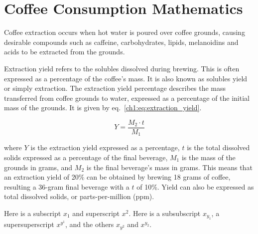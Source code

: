 \chapter{Coffee Consumption Mathematics}

Coffee extraction occurs when hot water is poured over coffee grounds, causing
desirable compounds such as caffeine, carbohydrates, lipids, melanoidins and
acids to be extracted from the grounds.

Extraction yield refers to the solubles dissolved during brewing. This is often
expressed as a percentage of the coffee's mass. It is also known as solubles
yield or simply extraction. The extraction yield percentage describes the mass
transferred from coffee grounds to water, expressed as a percentage of the
initial mass of the grounds. It is given by eq.~\eqref{ch1:eq:extraction_yield}.

\begin{equation}
    Y = \frac{M_2 \cdot t}{M_1}
    \label{ch1:eq:extraction_yield}
\end{equation}

where $Y$ is the extraction yield expressed as a percentage, $t$ is the total
dissolved solids expressed as a percentage of the final beverage, $M_1$ is the
mass of the grounds in grams, and $M_2$ is the final beverage's mass in grams.
This means that an extraction yield of 20\% can be obtained by brewing 18 grams
of coffee, resulting a 36-gram final beverage with a $t$ of 10\%. Yield can also
be expressed as total dissolved solids, or parts-per-million (ppm).

Here is a subscript $x_1$ and superscript $x^2$. Here is a subsubscript $x_{y_1}$,
a supersuperscript $x^{y^1}$, and the others $x_{y^2}$ and $x^{y_2}$.
